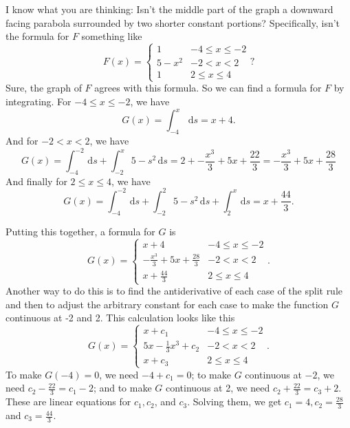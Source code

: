 \documentclass[12pt,fleqn,answers]{exam}
\begin{document}
\begin{solution}
I know what you are thinking: Isn't the middle part of the graph 
a downward facing parabola surrounded by two shorter constant 
portions? Specifically, isn't the formula for $F$ something like
\begin{equation*}
    F(x) = \begin{cases} 1 & -4 \leq x \leq -2 \\
                         5-x^2 & -2 < x < 2 \\
                         1     & 2 \leq x \leq 4
    \end{cases}?
  \end{equation*}    
Sure, the graph of $F$ agrees with this formula. So we can find a 
formula for $F$ by integrating. For $-4 \leq x \leq -2$, we have
\begin{equation*}
  G(x) = \int_{-4}^x \, \mathrm{d} s = x+4.
\end{equation*}
And for $-2 < x < 2$, we have
\begin{equation*}
  G(x) = \int_{-4}^{-2} \, \mathrm{d} s + 
  \int_{-2}^{x} 5 - s^2 \, \mathrm{d} s =
    2 + -\frac{{{x}^{3}}}{3}+5 x+\frac{22}{3}
     = -\frac{{{x}^{3}}}{3}+5 x+\frac{28}{3}
\end{equation*}
And finally for $2 \leq x \leq 4$, we have
\begin{equation*}
G(x) = \int_{-4}^{-2} \, \mathrm{d} s + 
\int_{-2}^{2} 5 - s^2 \, \mathrm{d} s 
+ \int_2^x  \, \mathrm{d} s = 
x+\frac{44}{3}.
\end{equation*}
\end{solution}
Putting this together, a formula for $G$ is
\begin{equation*}
  G(x) = \begin{cases} x+4 & -4 \leq x \leq -2 \\
    -\frac{{{x}^{3}}}{3}+5 x+\frac{28}{3} & -2 < x < 2 \\
    x+\frac{44}{3}     & 2 \leq x \leq 4
  \end{cases}.
\end{equation*}   
Another way to do this is to find the antiderivative of each
case of the split rule and then to adjust the arbitrary constant
for each case to make the function $G$ continuous at -2 and 2. 
This calculation looks like this
\begin{equation*}
    G(x) = \begin{cases} x + c_1  & -4 \leq x \leq -2 \\
                         5x - \frac{1}{3} x^3 + c_2 & -2 < x < 2 \\
                         x+ c_3    & 2 \leq x \leq 4
    \end{cases}.
  \end{equation*}  
To make $G(-4)=0$, we need $-4 + c_1 = 0$; to make $G$ continuous 
at $-2$, we need $c_2 -\frac{22}{3}=c_1-2$; and to make $G$ continuous at 2, 
we need $c_2+\frac{22}{3}=c_3+2$. These are linear equations for $c_1,c_2$, and $c_3$.
Solving them, we get $c_1 = 4, c_2 = \frac{28}{3}$ and $c_3=\frac{44}{3}$.
    
\end{document}
